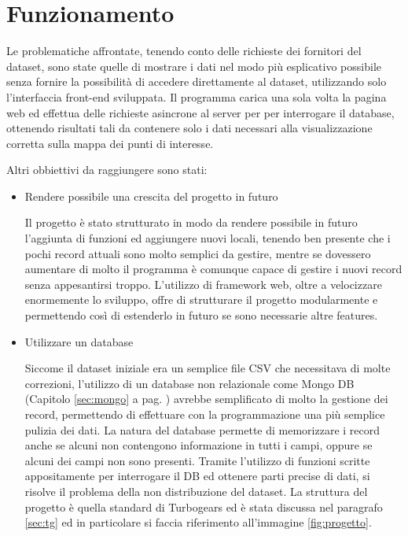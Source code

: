 \chapter{Funzionamento}%
Le problematiche affrontate, tenendo conto delle richieste dei fornitori del dataset, sono state quelle di mostrare i dati nel modo più esplicativo possibile senza fornire la possibilità di accedere direttamente al dataset, utilizzando solo l'interfaccia front-end sviluppata. Il programma carica una sola volta la pagina web ed effettua delle richieste asincrone al server per per interrogare il database, ottenendo risultati tali da contenere solo i dati necessari alla visualizzazione corretta sulla mappa dei punti di interesse.

Altri obbiettivi da raggiungere sono stati:
\begin{itemize}
	\item Rendere possibile una crescita del progetto in futuro

Il progetto è stato strutturato in modo da rendere possibile in futuro l'aggiunta di funzioni ed aggiungere nuovi locali, tenendo ben presente che i pochi record attuali sono molto semplici da gestire, mentre se dovessero aumentare di molto il programma è comunque capace di gestire i nuovi record senza appesantirsi troppo. L'utilizzo di framework web, oltre a velocizzare enormemente lo sviluppo, offre di strutturare il progetto modularmente e permettendo così di estenderlo in futuro se sono necessarie altre features.

	\item Utilizzare un database

Siccome il dataset iniziale era un semplice file CSV che necessitava di molte correzioni, l'utilizzo di un database non relazionale come Mongo DB (Capitolo \ref{sec:mongo} a pag. \pageref{sec:mongo} ) avrebbe semplificato di molto la gestione dei record, permettendo di effettuare con la programmazione una più semplice pulizia dei dati. La natura del database permette di memorizzare i record anche se alcuni non contengono informazione in tutti i campi, oppure se alcuni dei campi non sono presenti. Tramite l'utilizzo di funzioni scritte appositamente per interrogare il DB ed ottenere parti precise di dati, si risolve il problema della non distribuzione del dataset.
La struttura del progetto è quella standard di Turbogears ed è stata discussa nel paragrafo \ref{sec:tg} ed in particolare si faccia riferimento all'immagine \ref{fig:progetto}.

\end{itemize}

